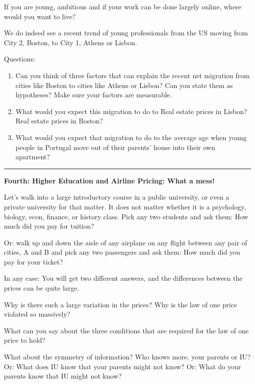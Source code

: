\documentclass[
]{book}
\begin{document}
If you are young, ambitious and if your work can be done largely online, where would you want to live?

We do indeed see a recent trend of young professionals from the US moving from City 2, Boston, to City 1, Athens or Lisbon.

Questions:

\begin{enumerate}
\def\labelenumi{\arabic{enumi}.}
\item
  Can you think of three factors that can explain the recent net migration from cities like Boston to cities like Athens or Lisbon? Can you state them as hypotheses? Make sure your factors are measurable.
\item
  What would you expect this migration to do to Real estate prices in Lisbon? Real estate prices in Boston?
\item
  What would you expect that migration to do to the average age when young people in Portugal move out of their parents' house into their own apartment?
\end{enumerate}

\begin{center}\rule{0.5\linewidth}{0.5pt}\end{center}

\textbf{Fourth: Higher Education and Airline Pricing: What a mess!}

Let's walk into a large introductory course in a public university, or even a private university for that matter. It does not matter whether it is a psychology, biology, econ, finance, or history class. Pick any two students and ask them: How much did you pay for tuition?

Or: walk up and down the aisle of any airplane on any flight between any pair of cities, A and B and pick any two passengers and ask them: How much did you pay for your ticket?

In any case: You will get two different answers, and the differences between the prices can be quite large.

Why is there such a large variation in the prices? Why is the law of one price violated so massively?

What can you say about the three conditions that are required for the law of one price to hold?

What about the symmetry of information? Who knows more, your parents or IU? Or: What does IU know that your parents might not know? Or: What do your parents know that IU might not know?
\end{document}
